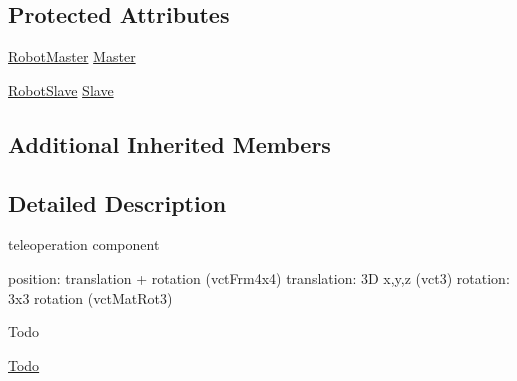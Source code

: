 \subsection*{Protected Attributes}
\begin{DoxyCompactItemize}
\item 
\hyperlink{classmts_tele_operation_1_1_robot_master}{Robot\-Master} \hyperlink{classmts_tele_operation_ab6560f81ba718ab14e33e7e38cc33860}{Master}
\item 
\hyperlink{classmts_tele_operation_1_1_robot_slave}{Robot\-Slave} \hyperlink{classmts_tele_operation_a7199e0f2fd813b121f3a5a84aa61ee7b}{Slave}
\end{DoxyCompactItemize}
\subsection*{Additional Inherited Members}


\subsection{Detailed Description}
teleoperation component 

position\-: translation + rotation (vct\-Frm4x4) translation\-: 3\-D x,y,z (vct3) rotation\-: 3x3 rotation (vct\-Mat\-Rot3)

\begin{DoxyRefDesc}{Todo}
\item[\hyperlink{todo__todo000017}{Todo}]\end{DoxyRefDesc}


